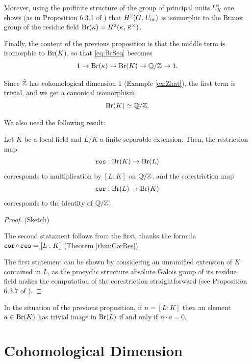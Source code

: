 \documentclass[a4paper, oneside]{memoir}
\begin{document}
Morever, using the profinite structure of the group of principal units $U_K^1$ one shows (as in Proposition 6.3.1 of \cite{SzamuelyGille}) that $H^{2}( G, \, U_{\text{nr}} )$ is isomorphic to
the Brauer group of the residue field $\mathrm{Br}(\kappa)=H^{2}( \kappa, \, \overline{\kappa}^\times )$.

Finally, the content of the previous proposition is that the middle term is isomorphic to $\mathrm{Br}(K)$, so that \eqref{eq:BrSeq} becomes
\[
    1\to\mathrm{Br}(\kappa)\to\mathrm{Br}(K)\to\mathbb{Q}/\mathbb{Z}\to 1.
\]

Since $\hat{\mathbb{Z}}$ has cohomological dimension 1 (Example \ref{ex:Zhat}), the first term is trivial, and we get a canonical isomorphism
\begin{equation}\label{eq:BrK}
    \mathrm{Br}(K)\simeq\mathbb{Q}/\mathbb{Z}.
\end{equation}

We also need the following result:

\begin{proposition}\label{prop:BrCorRes}
    Let $K$ be a local field and $L/K$ a finite separable extension. Then, the restriction map
    \[
        \operatorname{\mathtt{res}}: \mathrm{Br}(K)\to\mathrm{Br}(L)
    \]
    corresponds to multiplication by $[L:K]$ on $\mathbb{Q}/\mathbb{Z}$,
    and the corestriction map
    \[
        \operatorname{\mathtt{cor}}: \mathrm{Br}(L)\to\mathrm{Br}(K)
    \]
    corresponds to the identity of $\mathbb{Q}/\mathbb{Z}$.
\end{proposition}

\begin{proof}{(Sketch)}

    The second statament follows from the first, thanks the formula $\operatorname{\mathtt{cor}} \circ \operatorname{\mathtt{res}} = [L:K]$ (Theorem \ref{thm:CorRes}).

    The first statement can be shown by considering an unramified extension of $K$ contained in $L$, as the procyclic structure absolute Galois group of its residue field makes the computation of the corestriction
    straightforward (see Proposition 6.3.7 of \cite{SzamuelyGille}).
\end{proof}

\begin{corollary}\label{cor:BrRes}
    In the situation of the previous proposition, if $n=[L:K]$ then an element $a\in\mathrm{Br}(K)$ has trivial image in $\mathrm{Br}(L)$ if and only if $n\cdot a=0$.
\end{corollary}

\section{Cohomological Dimension}
\end{document}

